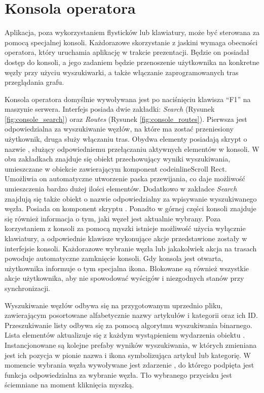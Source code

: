\section{Konsola operatora}
\label{sec:konsola_operatora}
Aplikacja, poza wykorzystaniem flysticków lub klawiatury, może być sterowana za pomocą specjalnej konsoli. Każdorazowe skorzystanie z jaskini wymaga obecności operatora, który uruchamia aplikację w trakcie prezentacji. Będzie on posiadał dostęp do konsoli, a jego zadaniem będzie przenoszenie użytkownika na konkretne węzły przy użyciu wyszukiwarki, a także włączanie zaprogramowanych tras przeglądania grafu. 

Konsola operatora domyślnie wywoływana jest po naciśnięciu klawisza ``F1'' na maszynie serwera. Interfejs posiada dwie zakładki: \textit{Search} (Rysunek \ref{fig:console_search}) oraz \textit{Routes} (Rysunek \ref{fig:console_routes}). Pierwsza jest odpowiedzialna za wyszukiwanie węzłów, na które ma zostać przeniesiony użytkownik, druga służy włączaniu tras. Obydwa elementy posiadają skrypt o nazwie , służący odpowiedniemu przełączaniu aktywnych elementów w konsoli. W obu zakładkach znajduje się obiekt przechowujący wyniki wyszukiwania, umieszczane w obiekcie zawierającym komponent codeinline{Scroll Rect}. Umożliwia on automatyczne utworzenie paska przewijania, co daje możliwość umieszczenia bardzo dużej ilości elementów. Dodatkowo w zakładce \textit{Search} znajdują się także obiekt o nazwie  odpowiedzialny za wpisywanie wyszukiwanego węzła. Posiada on komponent skryptu . Ponadto w górnej części konsoli znajduje się również informacja o tym, jaki węzeł jest aktualnie wybrany. Poza korzystaniem z konsoli za pomocą myszki istnieje możliwość użycia wyłącznie klawiatury, a odpowiednie klawisze wykonujące akcje przedstawione zostały w interfejsie konsoli. Każdorazowe wybranie węzła lub jakakolwiek akcja na trasach powoduje automatyczne zamknięcie konsoli. Gdy konsola jest otwarta, użytkownika informuje o tym specjalna ikona. Blokowane są również wszystkie akcje użytkownika, aby nie spowodować wyścigów i niezgodnych stanów przy synchronizacji.


Wyszukiwanie węzłów odbywa się na przygotowanym uprzednio pliku, zawierającym posortowane alfabetycznie nazwy artykułów i kategorii oraz ich ID. Przeszukiwanie listy odbywa się za pomocą algorytmu wyszukiwania binarnego. Lista elementów aktualizuje się z każdym wystąpieniem wydarzenia  obiektu . Instancjonowane są kolejne prefaby wyników wyszukiwania, w których zmieniana jest ich pozycja w pionie nazwa i ikona symbolizująca artykuł lub kategorię. W momencie wybrania węzła wywoływane jest zdarzenie , do którego podpięta jest funkcja  odpowiedzialna za wybranie węzła. Tło wybranego przycisku jest ściemniane na moment kliknięcia myszką.

